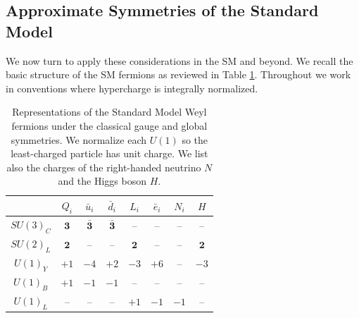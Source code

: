 \documentclass[11pt,a4paper]{article}
\begin{document}
\subsection{Approximate Symmetries of the Standard Model}

We now turn to apply these considerations in the SM and beyond.  We recall the basic structure of the SM fermions as reviewed in Table \ref{tab:charges}.  Throughout we work in conventions where hypercharge is integrally normalized.
{\setlength{\tabcolsep}{0.6 em}
\renewcommand{\arraystretch}{1.3}
\begin{table}[h]\centering
\large
\begin{tabular}{|c|c|c|c|c|c|c|c|}  \hline
 & $  Q_i  $ & $ \bar u_i $ & $ \bar d_i $ & $  L_i  $ & $ \bar e_i $ & $  N_i  $ & $ H $ \\ \hline
$SU(3)_C$ & $\mathbf{3}$ & $\bar{\mathbf{3}}$ & $\bar{\mathbf{3}}$ & -- & -- & -- & --\\ \hline
$SU(2)_L$ & $\mathbf{2}$ & -- & -- & $\mathbf{2}$ & -- & -- & $\mathbf{2}$\\ \hline
$U(1)_{Y}$ & $+1$ & $-4$ & $+2$ & $-3$ & $+6$ & -- & $-3$\\ \hline
$U(1)_{B}$ & $+1$ & $-1$ & $-1$ & -- & -- & -- & --\\ \hline
$U(1)_{L}$ & -- & -- & -- & $+1$ & $-1$ & $-1$ & --\\ \hline 
\end{tabular}\caption{Representations of the Standard Model Weyl fermions under the classical gauge and global symmetries. We normalize each $U(1)$ so the least-charged particle has unit charge. We list also the charges of the right-handed neutrino $N$ and the Higgs boson $H$.  }\label{tab:charges}
\end{table}}
\end{document}
